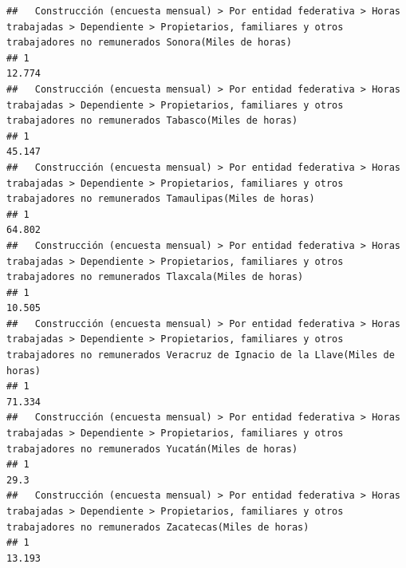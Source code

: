 \documentclass[
]{article}
\begin{document}
\begin{verbatim}
##   Construcción (encuesta mensual) > Por entidad federativa > Horas trabajadas > Dependiente > Propietarios, familiares y otros trabajadores no remunerados Sonora(Miles de horas) 
## 1                                                                                                                                                                           12.774
##   Construcción (encuesta mensual) > Por entidad federativa > Horas trabajadas > Dependiente > Propietarios, familiares y otros trabajadores no remunerados Tabasco(Miles de horas) 
## 1                                                                                                                                                                            45.147
##   Construcción (encuesta mensual) > Por entidad federativa > Horas trabajadas > Dependiente > Propietarios, familiares y otros trabajadores no remunerados Tamaulipas(Miles de horas) 
## 1                                                                                                                                                                               64.802
##   Construcción (encuesta mensual) > Por entidad federativa > Horas trabajadas > Dependiente > Propietarios, familiares y otros trabajadores no remunerados Tlaxcala(Miles de horas) 
## 1                                                                                                                                                                             10.505
##   Construcción (encuesta mensual) > Por entidad federativa > Horas trabajadas > Dependiente > Propietarios, familiares y otros trabajadores no remunerados Veracruz de Ignacio de la Llave(Miles de horas) 
## 1                                                                                                                                                                                                    71.334
##   Construcción (encuesta mensual) > Por entidad federativa > Horas trabajadas > Dependiente > Propietarios, familiares y otros trabajadores no remunerados Yucatán(Miles de horas) 
## 1                                                                                                                                                                              29.3
##   Construcción (encuesta mensual) > Por entidad federativa > Horas trabajadas > Dependiente > Propietarios, familiares y otros trabajadores no remunerados Zacatecas(Miles de horas) 
## 1                                                                                                                                                                              13.193

\end{verbatim}
\end{document}
